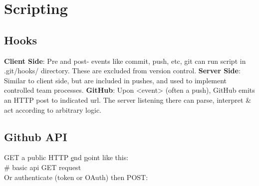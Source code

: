 \section{Scripting}

\subsection*{Hooks}
{\footnotesize 
\textbf{Client Side}: Pre and post- events like commit, push, etc, git can run script in .git/hooks/ directory.  These are excluded from version control. \textbf{Server Side}: Similar to client side, but are included in pushes, and used to implement controlled team processes.
\textbf{GitHub}: Upon <event> (often a push), GitHub emits an HTTP post to indicated url.  The server listening there can parse, interpret \& act according to arbitrary logic. 
}

\subsection*{Github API}
GET a public HTTP \underline{e}nd \underline{p}oint like this:\\
 \# basic api GET request \\
Or authenticate (token or OAuth) then POST: \\
\\
\phantom{xxxx} \\
\phantom{xxxx}  

\begin{comment}
Top level end-points:
\begin{multicols}{2}
\scriptsize
\begin{itemize}
    \item activity
    \item data
    \item gists
    \item actions
    \item interactions
    \item issues
    \item organizations
    \item projects
    \item PRs
    \item reactions
    \item teams
    \item users
\end{itemize}
\end{multicols}
\end{comment}
\
